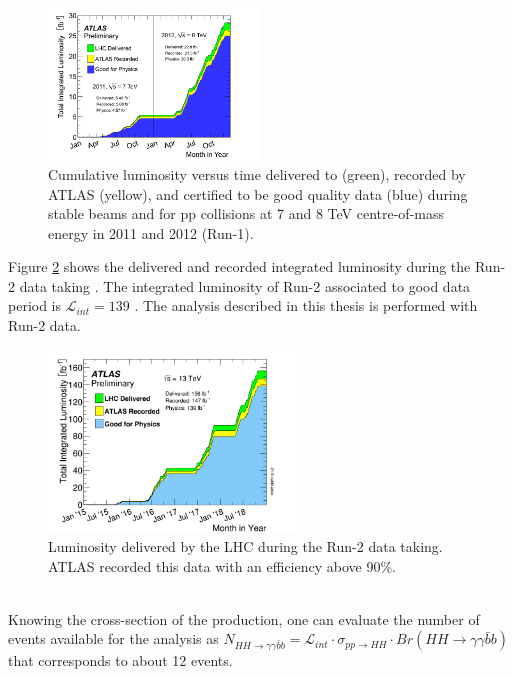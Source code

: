 \begin{figure}[htbp]
    \centering
    \includegraphics[width=0.5\textwidth]{Ch2/Img/LumiRun1.png}
    \caption{Cumulative luminosity versus time delivered to (green), recorded by ATLAS (yellow), and certified to be good quality data (blue) during stable beams and for pp collisions at 7 and 8 TeV centre-of-mass energy in 2011 and 2012 (Run-1).}
    \label{fig:chap2:LHC:Lumi:Run1}
\end{figure}
Figure \ref{fig:chap2:LHC:Lumi} shows the delivered and recorded integrated luminosity during the Run-2 data taking \cite{Lumi2018}. The integrated luminosity of Run-2 associated to good data period is $\mathcal{L}_{int} = 139 $ \ifb. The analysis described in this thesis is performed with Run-2 data.\\
\begin{figure}[htbp]
    \centering
    \includegraphics[width=0.6\textwidth]{Ch2/Img/Lumi.png}
    \caption{Luminosity delivered by the LHC during the Run-2 data taking. ATLAS recorded this data with an efficiency above 90\%.}
    \label{fig:chap2:LHC:Lumi}
\end{figure}
\\
Knowing the cross-section of the \HHyybb production, one can evaluate the number of events available for the analysis as $N_{HH\rightarrow\gamma\gamma\bar{b}b} = \mathcal{L}_{int}\cdot\sigma_{pp\rightarrow HH}\cdot Br(HH\rightarrow\gamma\gamma\bar{b}b)$ that corresponds to about 12 events.

